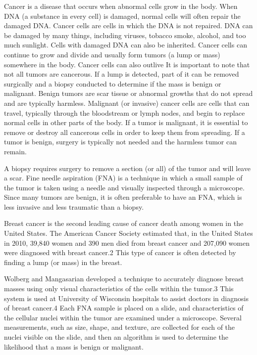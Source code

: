 \documentclass[
]{report}
\begin{document}
Cancer is a disease that occurs when abnormal cells grow in the body. When DNA (a substance in every
cell) is damaged, normal cells will often repair the damaged DNA. Cancer cells are cells in which the
DNA is not repaired. DNA can be damaged by many things, including viruses, tobacco smoke, alcohol,
and too much sunlight. Cells with damaged DNA can also be inherited. Cancer cells can continue to grow
and divide and usually form tumors (a lump or mass) somewhere in the body. Cancer cells can also outlive
It is important to note that not all tumors are cancerous. If a lump is detected, part of it can be removed
surgically and a biopsy conducted to determine if the mass is benign or malignant. Benign tumors are scar
tissue or abnormal growths that do not spread and are typically harmless. Malignant (or invasive) cancer
cells are cells that can travel, typically through the bloodstream or lymph nodes, and begin to replace normal
cells in other parts of the body. If a tumor is malignant, it is essential to remove or destroy all cancerous cells
in order to keep them from spreading. If a tumor is benign, surgery is typically not needed and the harmless
tumor can remain.

A biopsy requires surgery to remove a section (or all) of the tumor and will leave a scar. Fine needle
aspiration (FNA) is a technique in which a small sample of the tumor is taken using a needle and visually
inspected through a microscope. Since many tumors are benign, it is often preferable to have an FNA, which
is less invasive and less traumatic than a biopsy.

Breast cancer is the second leading cause of cancer death among women in the United States. The
American Cancer Society estimated that, in the United States in 2010, 39,840 women and 390 men died from
breast cancer and 207,090 women were diagnosed with breast cancer.2 This type of cancer is often detected
by finding a lump (or mass) in the breast.

Wolberg and Mangasarian developed a technique to accurately diagnose breast masses using only visual
characteristics of the cells within the tumor.3 This system is used at University of Wisconsin hospitals to assist
doctors in diagnosis of breast cancer.4 Each FNA sample is placed on a slide, and characteristics of the cellular
nuclei within the tumor are examined under a microscope. Several measurements, such as size, shape, and
texture, are collected for each of the nuclei visible on the slide, and then an algorithm is used to determine the
likelihood that a mass is benign or malignant.
\end{document}
